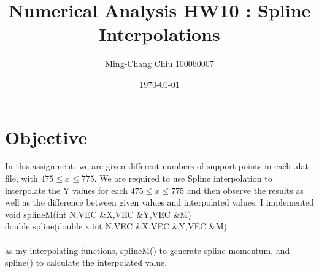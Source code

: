 \documentclass[12pt,a4paper]{article}
\title{Numerical Analysis HW10 : Spline Interpolations}
\author{Ming-Chang Chiu 100060007}
\date{\today}
\begin{document}
\maketitle
\fontsize{12}{20pt}\selectfont %

\section{Objective}
In this assignment, we are given different numbers of support points in each .dat file, with $475 \le x \le 775$. We are required to use Spline interpolation to interpolate the Y values for each $475 \le x \le 775$ and then observe the results as well as the difference between given values and interpolated values. I implemented\\ 

void splineM(int N,VEC \&X,VEC \&Y,VEC \&M)\\

double spline(double x,int N,VEC \&X,VEC \&Y,VEC \&M)\\\\
as my interpolating functions, splineM() to generate spline momentum, and spline() to calculate the interpolated value.
\end{document}
